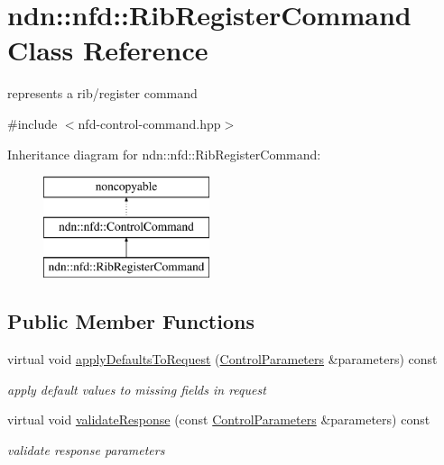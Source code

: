 \hypertarget{classndn_1_1nfd_1_1RibRegisterCommand}{}\section{ndn\+:\+:nfd\+:\+:Rib\+Register\+Command Class Reference}
\label{classndn_1_1nfd_1_1RibRegisterCommand}


represents a rib/register command  




{\ttfamily \#include $<$nfd-\/control-\/command.\+hpp$>$}

Inheritance diagram for ndn\+:\+:nfd\+:\+:Rib\+Register\+Command\+:\begin{figure}[H]
\begin{center}
\leavevmode
\includegraphics[height=3.000000cm]{classndn_1_1nfd_1_1RibRegisterCommand}
\end{center}
\end{figure}
\subsection*{Public Member Functions}
\begin{DoxyCompactItemize}
\item 
virtual void \hyperlink{classndn_1_1nfd_1_1RibRegisterCommand_ac15e689780f1b70ce3e94d9403e58861}{apply\+Defaults\+To\+Request} (\hyperlink{classndn_1_1nfd_1_1ControlParameters}{Control\+Parameters} \&parameters) const\hypertarget{classndn_1_1nfd_1_1RibRegisterCommand_ac15e689780f1b70ce3e94d9403e58861}{}\label{classndn_1_1nfd_1_1RibRegisterCommand_ac15e689780f1b70ce3e94d9403e58861}

\begin{DoxyCompactList}\small\item\em apply default values to missing fields in request \end{DoxyCompactList}\item 
virtual void \hyperlink{classndn_1_1nfd_1_1RibRegisterCommand_a2f0b8f3e6d3e76e24b7e3a92d1e5436c}{validate\+Response} (const \hyperlink{classndn_1_1nfd_1_1ControlParameters}{Control\+Parameters} \&parameters) const
\begin{DoxyCompactList}\small\item\em validate response parameters \end{DoxyCompactList}\end{DoxyCompactItemize}
